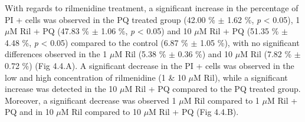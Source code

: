With regards to rilmenidine treatment, a significant increase in the percentage of PI + cells was observed in the PQ treated group (42.00 \% $\pm$ 1.62 \%, \textit{p} < 0.05), 1 $\mu$M Ril + PQ (47.83 \% $\pm$ 1.06 \%, \textit{p} < 0.05) and 10 $\mu$M Ril + PQ (51.35 \% $\pm$ 4.48 \%, \textit{p} < 0.05) compared to the control (6.87 \% $\pm$ 1.05 \%), with no significant differences observed in the 1 $\mu$M Ril (5.38 \% $\pm$ 0.36 \%) and 10 $\mu$M Ril (7.82 \% $\pm$ 0.72 \%) (Fig 4.4.A). A significant decrease in the PI + cells was observed in the low and high concentration of rilmenidine (1 \& 10 $\mu$M Ril), while a significant increase was detected in the 10 $\mu$M Ril + PQ compared to the PQ treated group.  Moreover, a significant decrease was observed 1 $\mu$M Ril compared to 1 $\mu$M Ril + PQ and in 10 $\mu$M Ril compared to 10 $\mu$M Ril + PQ (Fig 4.4.B).



























